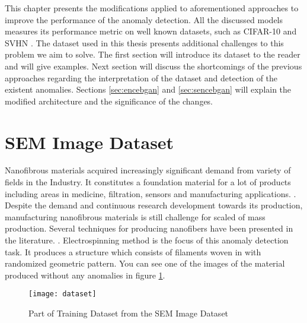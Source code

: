 
\begingroup

This chapter presents the modifications applied to aforementioned approaches to improve the performance 
of the anomaly detection. All the discussed models measures its performance metric on well known datasets, 
such as CIFAR-10 \cite{cifar10} and SVHN \cite{Netzer2011ReadingDI}. The dataset used in this thesis presents 
additional challenges to this problem we aim to solve. The first section will introduce its dataset to the 
reader and will give examples. Next section will discuss the shortcomings of the previous approaches regarding 
the interpretation of the dataset and detection of the existent anomalies. Sections \ref{sec:encebgan} and 
\ref{sec:sencebgan} will explain the modified architecture and the significance of the changes.

\section{SEM Image Dataset}
\label{sec:sem}

Nanofibrous materials acquired increasingly significant demand from variety of fields in the Industry. 
It constitutes a foundation material for a lot of products including areas in medicine, filtration, sensors 
and manufacturing applications. \cite{carrera2016defect}. Despite the demand and continuous research 
development towards its production, manufacturing nanofibrous materials is still  challenge for scaled of 
mass production. Several techniques for producing nanofibers have been presented in the literature. 
\cite{carrera2016defect}. Electrospinning method is the focus of this anomaly detection task. It produces 
a structure which consists of filaments woven in with randomized geometric pattern. You can see one of the images 
of the material produced without any anomalies in figure \ref{fig:data_norm}.

\begin{figure}[h!]
	\centering
	\texttt{[image: dataset]}
	\caption{Part of Training Dataset from the SEM Image Dataset \cite{sem}}
	\label{fig:data_norm}
\end{figure}

